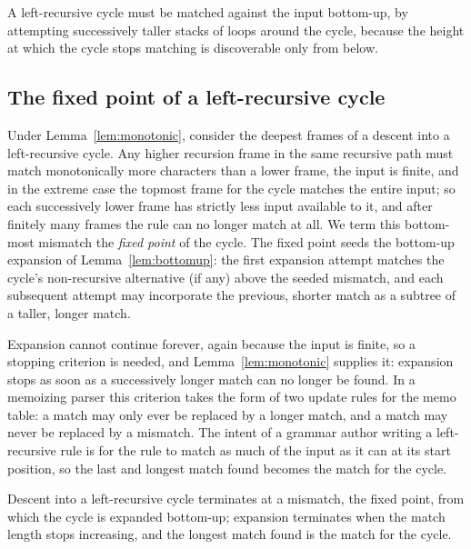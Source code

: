 \documentclass[manuscript]{acmart}
\begin{document}
\begin{lemma}
\label{lem:bottomup}
A left-recursive cycle must be matched against the input bottom-up, by attempting successively taller stacks of loops around the cycle, because the height at which the cycle stops matching is discoverable only from below.
\end{lemma}

\subsection{The fixed point of a left-recursive cycle}
\label{sec:fixedpoint}

Under Lemma~\ref{lem:monotonic}, consider the deepest frames of a descent into a left-recursive cycle. Any higher recursion frame in the same recursive path must match monotonically more characters than a lower frame, the input is finite, and in the extreme case the topmost frame for the cycle matches the entire input; so each successively lower frame has strictly less input available to it, and after finitely many frames the rule can no longer match at all. We term this bottom-most mismatch the \emph{fixed point} of the cycle. The fixed point seeds the bottom-up expansion of Lemma~\ref{lem:bottomup}: the first expansion attempt matches the cycle's non-recursive alternative (if any) above the seeded mismatch, and each subsequent attempt may incorporate the previous, shorter match as a subtree of a taller, longer match.

Expansion cannot continue forever, again because the input is finite, so a stopping criterion is needed, and Lemma~\ref{lem:monotonic} supplies it: expansion stops as soon as a successively longer match can no longer be found. In a memoizing parser this criterion takes the form of two update rules for the memo table: a match may only ever be replaced by a longer match, and a match may never be replaced by a mismatch. The intent of a grammar author writing a left-recursive rule is for the rule to match as much of the input as it can at its start position, so the last and longest match found becomes the match for the cycle.

\begin{lemma}
\label{lem:fixpoint}
Descent into a left-recursive cycle terminates at a mismatch, the fixed point, from which the cycle is expanded bottom-up; expansion terminates when the match length stops increasing, and the longest match found is the match for the cycle.
\end{lemma}
\end{document}
